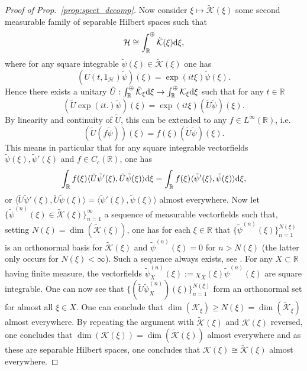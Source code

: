 \documentclass[sn-mathphys-num]{sn-jnl}%
\newcommand{\RR}{\mathbb{R}}
\newcommand{\HH}{\mathcal{H}}
\newcommand{\KK}{\mathcal{K}}
\newcommand{\diff}{\textup{d}}
\numberwithin{equation}{section}
\theoremstyle{thmstyleone}%
\theoremstyle{thmstyletwo}%
\theoremstyle{thmstylethree}%
\begin{document}
\begin{proof}[Proof of Prop.\ \ref{prop:spect_decomp}]
    Now consider $\xi\mapsto\tilde{\KK}(\xi)$ some second measurable family of separable Hilbert spaces such that
    \begin{equation}
        \HH\cong \int_\RR^\oplus \tilde{\KK}(\xi)\diff\xi,
    \end{equation}
    where for any square integrable $\tilde{\psi}(\xi)\in \tilde{\KK}(\xi)$ one has 
    \begin{equation}
        (U(t,1_\HH)\tilde{\psi})(\xi)=\exp(it\xi)\tilde{\psi}(\xi).
    \end{equation}
    Hence there exists a unitary $\tilde{U}:\int_\RR^\oplus \tilde{\KK}_\xi\diff\xi\to \int_\RR^\oplus \KK_\xi\diff\xi$ such that for any $t\in \RR$
    \begin{equation}
        (\tilde{U}\exp(it.)\tilde{\psi})(\xi)=\exp(it\xi)(\tilde{U}\tilde{\psi})(\xi).
    \end{equation}
    By linearity and continuity of $\tilde{U}$, this can be extended to any $f\in L^\infty(\RR)$, i.e.
    \begin{equation}
        (\tilde{U}(f\tilde{\psi}))(\xi)=f(\xi)(\tilde{U}\tilde{\psi})(\xi).
    \end{equation}
    This means in particular that for any square integrable vectorfields $\tilde{\psi}(\xi),\tilde{\psi}'(\xi)$ and $f\in C_c(\RR)$, one has 
    \begin{equation}
        \int_\RR f(\xi)\langle \tilde{U}\tilde{\psi}'(\xi),\tilde{U}\tilde{\psi}(\xi)\rangle\diff\xi=\int_\RR f(\xi)\langle \tilde{\psi}'(\xi),\tilde{\psi}(\xi)\rangle\diff\xi,
    \end{equation}
    or $\langle \tilde{U}\tilde{\psi}'(\xi),\tilde{U}\tilde{\psi}(\xi)\rangle=\langle \tilde{\psi}'(\xi),\tilde{\psi}(\xi)\rangle$ almost everywhere.
    Now let $\{\tilde{\psi}^{(n)}(\xi)\in \tilde{\KK}(\xi)\}_{n=1}^\infty$ a sequence of measurable vectorfields such that, setting $N(\xi)=\dim(\tilde{\KK}(\xi))$, one has for each $\xi\in \RR$ that $\{\tilde{\psi}^{(n)}(\xi)\}_{n=1}^{N(\xi)}$ is an orthonormal basis for $\tilde{\KK}(\xi)$ and $\tilde{\psi}^{(n)}(\xi)=0$ for $n> N(\xi)$ (the latter only occurs for $N(\xi)<\infty$). Such a sequence always exists, see \cite[Lem.\ IV.8.12]{Takesaki2001}. For any $X\subset \RR$ having finite measure, the vectorfields $\tilde{\psi}_X^{(n)}(\xi):=\chi_X(\xi)\tilde{\psi}^{(n)}(\xi)$ are square integrable. One can now see that $\{(\tilde{U}\tilde{\psi}_{X}^{(n)})(\xi)\}_{n=1}^{N(\xi)}$ form an orthonormal set for almost all $\xi\in X$. One can conclude that $\dim(\KK_\xi)\geq N(\xi)=\dim(\tilde{\KK}_\xi)$ almost everywhere. By repeating the argument with $\tilde{\KK}(\xi)$ and $\KK(\xi)$ reversed, one concludes that $\dim(\KK(\xi))=\dim(\tilde{\KK}(\xi))$ almost everywhere and as these are separable Hilbert spaces, one concludes that $\KK(\xi)\cong \tilde{\KK}(\xi)$ almost everywhere.
    \end{proof}
\end{document}
